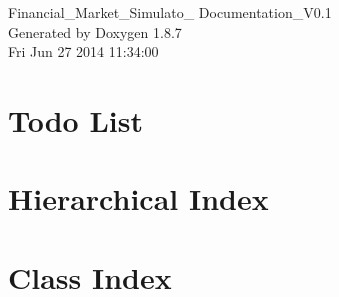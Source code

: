 \documentclass[twoside]{book}
\newcommand{\+}{\discretionary{\mbox{\scriptsize$\hookleftarrow$}}{}{}}
\newcommand{\clearemptydoublepage}{%
  \newpage{\pagestyle{empty}\cleardoublepage}%
}
\begin{document}
\hypersetup{pageanchor=false,
             bookmarks=true,
             bookmarksnumbered=true,
             pdfencoding=unicode
            }
\begin{titlepage}
\vspace*{7cm}
\begin{center}%
{\Large Financial\+\_\+\+Market\+\_\+\+Simulato\+\_\+ Documentation\+\_\+\+V0.1 }\\
\vspace*{1cm}
{\large Generated by Doxygen 1.8.7}\\
\vspace*{0.5cm}
{\small Fri Jun 27 2014 11:34:00}\\
\end{center}
\end{titlepage}
\clearemptydoublepage
\tableofcontents
\clearemptydoublepage
{}
\hypersetup{pageanchor=true}

\chapter{Todo List}
\label{todo}
\hypertarget{todo}{}

\chapter{Hierarchical Index}

\chapter{Class Index}

\end{document}
